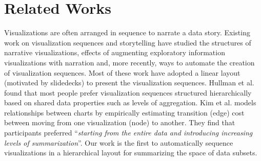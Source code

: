 \section{Related Works}
\npar {}
Visualizations are often arranged in sequence to narrate a data story. Existing work on visualization sequences and storytelling have studied the structures of narrative visualizations\cite{Segel2010,Hullman2017}, effects of augmenting exploratory information visualizations with narration\cite{Boy2015} and, more recently, ways to automate the creation of visualization sequences\cite{Hullman2013,Kim2017}. Most of these work have adopted a linear layout (motivated by slidedecks) to present the visualization sequences. Hullman et al. \cite{Hullman2017} found that most people prefer visualization sequences structured hierarchically based on shared data properties such as levels of aggregation. %
Kim et al. \cite{Kim2017} models relationships between charts by empirically estimating transition (edge) cost between moving from one visualization (node) to another. They find that participants preferred ``\textit{starting from the entire data and introducing increasing levels of summarization}''. Our work is the first to automatically sequence visualizations in a hierarchical layout for summarizing the space of data subsets. %

